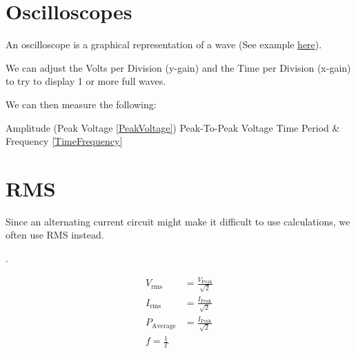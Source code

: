 
\section{Oscilloscopes}
An oscilloscope is a graphical representation of a wave (See example \href{https://academo.org/demos/virtual-oscilloscope/}{here}).

We can adjust the Volts per Division (y-gain) and the Time per Division (x-gain) to try to display 1 or more full waves.

We can then measure the following:
\begin{enumerate}
	\ii Amplitude (Peak Voltage \eqref{PeakVoltage})
	\ii Peak-To-Peak Voltage
	\ii Time Period \& Frequency \eqref{TimeFrequency}
	
\end{enumerate}

\section[Root Mean Squared]{RMS}
Since an alternating current circuit might make it difficult to use calculations, we often use RMS instead.

.

\begin{align}
	V_{\text{rms}} &= \frac{V_{\text{Peak}} \label{PeakVoltage}}{\sqrt{2}} \\
	I_{\text{rms}} &= \frac{I_{\text{Peak}}}{\sqrt{2}} \nonumber \\
	P_{\text{Average}} &= \frac{I_{\text{Peak}}}{\sqrt{2}} \nonumber \\ 
	f = \frac{1}{T} \label{TimeFrequency} 
\end{align}